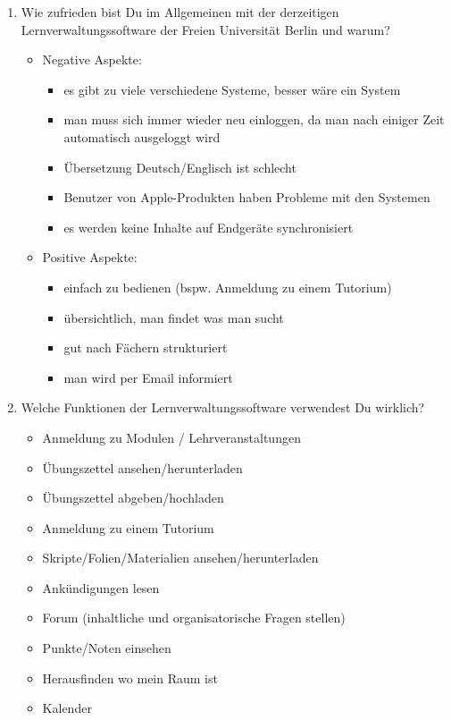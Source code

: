 \documentclass{article}
\begin{document}
\begin{enumerate}
\item Wie zufrieden bist Du im Allgemeinen mit der derzeitigen Lernverwaltungssoftware der Freien Universität Berlin und warum?
\begin{itemize}
\item Negative Aspekte:
	\begin{itemize}
	\item es gibt zu viele verschiedene Systeme, besser wäre ein System
	\item man muss sich immer wieder neu einloggen, da man nach einiger Zeit automatisch ausgeloggt wird
	\item Übersetzung Deutsch/Englisch ist schlecht
	\item Benutzer von Apple-Produkten haben Probleme mit den Systemen
	\item es werden keine Inhalte auf Endgeräte synchronisiert
	\end{itemize}
\item Positive Aspekte:
	\begin{itemize}
	\item einfach zu bedienen (bspw. Anmeldung zu einem Tutorium)
	\item übersichtlich, man findet was man sucht
	\item gut nach Fächern strukturiert
	\item man wird per Email informiert
	\end{itemize}
\end{itemize}

\item Welche Funktionen der Lernverwaltungssoftware verwendest Du wirklich?
\begin{itemize}
\item Anmeldung zu Modulen / Lehrveranstaltungen
\item Übungszettel ansehen/herunterladen
\item Übungszettel abgeben/hochladen
\item Anmeldung zu einem Tutorium
\item Skripte/Folien/Materialien ansehen/herunterladen
\item Ankündigungen lesen
\item Forum (inhaltliche und organisatorische Fragen stellen)
\item Punkte/Noten einsehen
\item Herausfinden wo mein Raum ist
\item Kalender
\end{itemize}


\end{enumerate}
\end{document}

